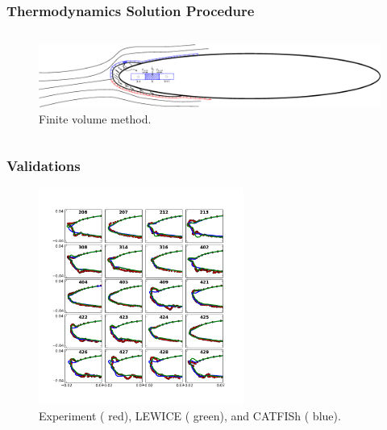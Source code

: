 \documentclass[9pt]{beamer}
\begin{document}
\begin{frame}
\frametitle{Thermodynamics Solution Procedure}
\label{sec-3-5}

\begin{columns}[c]
\hspace*{-0.5cm}
\centering
\begin{figure}[ht]
  \centering
  \includegraphics[trim=70mm 20mm 270mm 20mm,clip,width=1\textwidth]{FiniteVolume}
  \caption{Finite volume method.}
\end{figure}
\end{columns}
\end{frame}
\begin{frame}
\frametitle{Validations}
\label{sec-3-6}

\vspace*{-0.5cm}
\begin{figure}[ht]
  \centering
  \includegraphics[trim=0.625in 0.75in 0.83in 0.8in,clip,width=0.6\textwidth]{IceShapeValidations.png}
  \caption{Experiment ({\color{red} red}), LEWICE ({\color{green} green}), and CATFISh ({\color{blue} blue}).}
\end{figure}
\end{frame}
\end{document}
